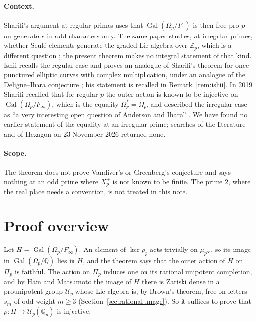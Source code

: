 \documentclass[11pt]{article}
\theoremstyle{definition}
\numberwithin{equation}{section}
\begin{document}
\paragraph{Context.}
Sharifi's argument at regular primes uses that $\operatorname{Gal}(\Omega_p/F_1)$ is then free pro-$p$ on
generators in odd characters only. The same paper studies, at irregular primes, whether Soul\'e elements generate
the graded Lie algebra over $\mathbb Z_p$, which is a different question \cite[Sections 1 and 4]{Sharifi2002};
the present theorem makes no integral statement of that kind. Ishii recalls the regular case
\cite[Theorem 1.1 and Remark 1.1.1, p.~2]{IshiiKernel2026} and proves an analogue of Sharifi's theorem for
once-punctured elliptic curves with complex multiplication, under an analogue of the Deligne--Ihara conjecture
\cite[Theorem~A, p.~2]{IshiiKernel2026}; his statement is recalled in Remark~\ref{rem:ishii}. In 2019 Sharifi
recalled that for regular $p$ the outer action is known to be injective on
$\operatorname{Gal}(\Omega_p/F_\infty)$, which is the equality $\Omega_p^*=\Omega_p$, and described the irregular
case as ``a very interesting open question of Anderson and Ihara'' \cite[\S1, p.~221]{Sharifi2019}. We have found
no earlier statement of the equality at an irregular prime; searches of the literature and of Hexagon on 23
November 2026 returned none.

\paragraph{Scope.}
The theorem does not prove Vandiver's or Greenberg's conjecture and says nothing at an odd prime where $X_p^+$ is
not known to be finite. The prime $2$, where the real place needs a convention, is not treated in this note.

\section{Proof overview}

Let $H=\operatorname{Gal}(\Omega_p/F_\infty)$. An element of $\ker\rho_p$ acts trivially on $\mu_{p^\infty}$, so
its image in $\operatorname{Gal}(\Omega_p/\mathbb Q)$ lies in $H$, and the theorem says that the outer action of
$H$ on $\Pi_p$ is faithful. The action on $\Pi_p$ induces one on its rational unipotent completion, and by Hain
and Matsumoto the image of $H$ there is Zariski dense in a prounipotent group $\mathcal U_p$ whose Lie algebra is,
by Brown's theorem, free on letters $s_m$ of odd weight $m\ge3$ (Section~\ref{sec:rational-image}). So it suffices
to prove that $\rho:H\to\mathcal U_p(\mathbb Q_p)$ is injective.
\end{document}
